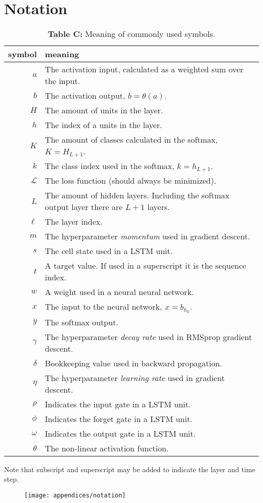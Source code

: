 \chapter{Notation}

\begin{table}[H]
\centering
\begin{tabular}{r p{10cm}}
	symbol & meaning \\ \hline
	$a$ & The activation input, calculated as a weighted sum over the input. \\
	$b$ & The activation output, $b = \theta(a)$. \\
	$H$ & The amount of units in the layer.\\
	$h$ & The index of a units in the layer. \\
	$K$ & The amount of classes calculated in the softmax, $K = H_{L+1}$. \\ 
	$k$ & The class index used in the softmax, $k = h_{L + 1}$.  \\
	$\mathcal{L}$ & The loss function (should always be minimized). \\
	$L$ & The amount of hidden layers. Including the softmax output layer there are $L+1$ layers. \\
	$\ell$ & The layer index. \\
	$m$ & The hyperparameter \textit{momentum} used in gradient descent. \\
	$s$ & The cell state used in a LSTM unit. \\
	$t$ & A target value. If used in a superscript it is the sequence index. \\
	$w$ & A weight used in a neural neural network. \\
	$x$ & The input to the neural network, $x = b_{h_0}$. \\
	$y$ & The softmax output. \\
	$\gamma$ & The hyperparameter \textit{decay rate} used in RMSprop gradient descent. \\
	$\delta$ & Bookkeeping value used in backward propagation. \\
	$\eta$ & The hyperparameter \textit{learning rate} used in gradient descent. \\
	$\rho$ & Indicates the input gate in a LSTM unit. \\ 
	$\phi$ & Indicates the forget gate in a LSTM unit. \\ 
	$\omega$ & Indicates the output gate in a LSTM unit. \\ 
	$\theta$ & The non-linear activation function.
\end{tabular}
\caption*{\textbf{Table C:} Meaning of commonly used symbols.}
\end{table}

\vspace{-0.1cm}
Note that subscript and superscript may be added to indicate the layer and time step.
\begin{figure}[H]
	\vspace{-0.2cm}
	\centering
	\texttt{[image: appendices/notation]}
\end{figure}
